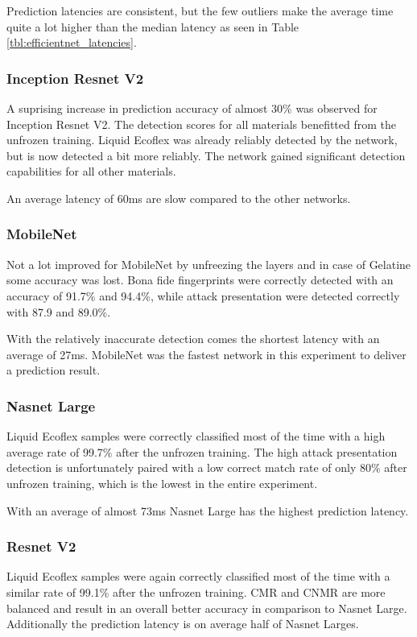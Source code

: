 Prediction latencies are consistent, but the few outliers make the average time quite a lot higher than the median latency as seen in Table \ref{tbl:efficientnet_latencies}.



\subsubsection{Inception Resnet V2}
A suprising increase in prediction accuracy of almost 30\% was observed for Inception Resnet V2.
The detection scores for all materials benefitted from the unfrozen training.
Liquid Ecoflex was already reliably detected by the network, but is now detected a bit more reliably.
The network gained significant detection  capabilities for all other materials.

An average latency of 60ms are slow compared to the other networks.



\subsubsection{MobileNet}
Not a lot improved for MobileNet by unfreezing the layers and in case of Gelatine some accuracy was lost.
Bona fide fingerprints were correctly detected with an accuracy of 91.7\% and 94.4\%, while attack presentation were detected correctly with 87.9 and 89.0\%.

With the relatively inaccurate detection comes the shortest latency with an average of 27ms.
MobileNet was the fastest network in this experiment to deliver a prediction result.



\subsubsection{Nasnet Large}
Liquid Ecoflex samples were correctly classified most of the time with a high average rate of 99.7\% after the unfrozen training.
The high attack presentation detection is unfortunately paired with a low correct match rate of only 80\% after unfrozen training, which is the lowest in the entire experiment.

With an average of almost 73ms Nasnet Large has the highest prediction latency.



\subsubsection{Resnet V2}
Liquid Ecoflex samples were again correctly classified most of the time with a similar rate of 99.1\% after the unfrozen training.
CMR and CNMR are more balanced and result in an overall better accuracy in comparison to Nasnet Large.
Additionally the prediction latency is on average half of Nasnet Larges.

